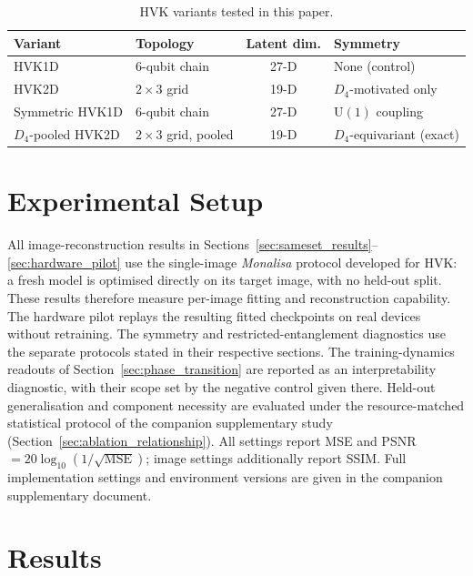 \documentclass[pdflatex,sn-basic]{sn-jnl}
\begin{document}
\begin{table}[t]
  \centering
  \caption{HVK variants tested in this paper.}
  \label{tab:variants}
  \begin{tabular}{@{}l l c l@{}}
    \toprule
    Variant                 & Topology                  & Latent dim. & Symmetry \\
    \midrule
    HVK1D                   & 6-qubit chain             & 27-D        & None (control)            \\
    HVK2D                   & $2\times3$ grid           & 19-D        & $D_4$-motivated only      \\
    Symmetric HVK1D         & 6-qubit chain             & 27-D        & $\mathrm{U}(1)$ coupling  \\
    $D_4$-pooled HVK2D      & $2\times3$ grid, pooled   & 19-D        & $D_4$-equivariant (exact) \\
    \bottomrule
  \end{tabular}
\end{table}

\section{Experimental Setup}
\label{sec:protocol}

\color{green}
All image-reconstruction results in
Sections~\ref{sec:sameset_results}--\ref{sec:hardware_pilot} use the single-image
\textit{Monalisa} protocol developed for HVK: a fresh model is optimised directly
on its target image, with no held-out split. These results therefore measure
per-image fitting and reconstruction capability. The hardware pilot replays the
resulting fitted checkpoints on real devices without retraining. The symmetry
and restricted-entanglement diagnostics use the separate protocols stated in
their respective sections. The training-dynamics
readouts of Section~\ref{sec:phase_transition} are reported as an
interpretability diagnostic, with their scope set by the negative control given
there. Held-out generalisation and component necessity are evaluated under the
resource-matched statistical protocol of the companion supplementary study
(Section~\ref{sec:ablation_relationship}). All settings report MSE and
PSNR $=20\log_{10}(1/\sqrt{\mathrm{MSE}})$; image settings
additionally report SSIM. Full implementation settings and environment versions
are given in the companion supplementary document.
\color{black}

\section{Results}
\label{sec:results}
\end{document}

